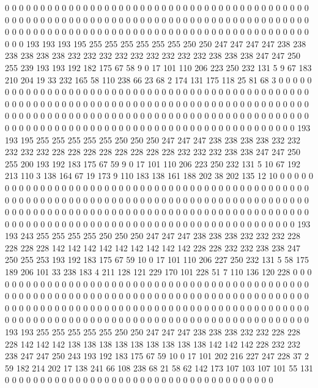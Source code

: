 0 0 0 0 0 0 0 0 0 0 0 0 0 0 0 0 0 0 0 0
0 0 0 0 0 0 0 0 0 0 0 0 0 0 0 0 0 0 0 0
0 0 0 0 0 0 0 0 0 0 0 0 0 0 0 0 0 0 0 0
0 0 0 0 0 0 0 0 0 0 0 0 0 0 0 0 0 0 0 0
0 0 0 0 0 0 0 0 0 0 0 0 0 0 0 0 0 0 0 0
0 0 0 0 0 0 0 0 0 0 0 0 0 0 0 0 0 0 0 0
0 0 0 0 0 0 0 0 0 0 0 0 193 193 193 195 255 255 255 255
255 255 250 250 247 247 247 247 238 238 238 238 238 238 232 232 232 232 232 232
232 232 232 238 238 238 247 247 250 255 239 193 193 192 182 175 67 58 9 0
17 101 110 206 223 250 232 131 5 9 67 183 210 204 19 33 232 165 58 110
238 66 23 68 2 174 131 175 118 25 81 68 3 0 0 0 0 0 0 0
0 0 0 0 0 0 0 0 0 0 0 0 0 0 0 0 0 0 0 0
0 0 0 0 0 0 0 0 0 0 0 0 0 0 0 0 0 0 0 0
0 0 0 0 0 0 0 0 0 0 0 0 0 0 0 0 0 0 0 0
0 0 0 0 0 0 0 0 0 0 0 0 0 0 0 0 0 0 0 0
0 0 0 0 0 0 0 0 0 0 0 0 0 0 0 0 0 0 0 0
0 0 0 0 0 0 0 0 0 0 0 0 0 0 0 0 0 0 0 0
0 0 0 0 0 0 0 0 0 0 0 0 0 0 0 0 0 0 0 0
0 0 0 0 0 0 0 0 0 0 0 0 0 0 0 0 0 0 0 0
0 0 0 0 0 0 0 0 193 193 195 255 255 255 255 255 250 250 250 247
247 247 238 238 238 238 232 232 232 232 232 228 228 228 228 228 228 228 228 232
232 232 238 238 247 247 250 255 200 193 192 183 175 67 59 9 0 17 101 110
206 223 250 232 131 5 10 67 192 213 110 3 138 164 67 19 173 9 110 183
138 161 188 202 38 202 135 12 10 0 0 0 0 0 0 0 0 0 0 0
0 0 0 0 0 0 0 0 0 0 0 0 0 0 0 0 0 0 0 0
0 0 0 0 0 0 0 0 0 0 0 0 0 0 0 0 0 0 0 0
0 0 0 0 0 0 0 0 0 0 0 0 0 0 0 0 0 0 0 0
0 0 0 0 0 0 0 0 0 0 0 0 0 0 0 0 0 0 0 0
0 0 0 0 0 0 0 0 0 0 0 0 0 0 0 0 0 0 0 0
0 0 0 0 0 0 0 0 0 0 0 0 0 0 0 0 0 0 0 0
0 0 0 0 0 0 0 0 0 0 0 0 0 0 0 0 0 0 0 0
0 0 0 0 0 0 0 0 0 0 0 0 0 0 0 0 0 0 0 0
0 0 0 0 193 193 243 255 255 255 255 250 250 250 247 247 247 238 238 238
232 232 232 228 228 228 228 142 142 142 142 142 142 142 142 142 228 228 232 232
238 238 247 250 255 253 193 192 183 175 67 59 10 0 17 101 110 206 227 250
232 131 5 58 175 189 206 101 33 238 183 4 211 128 121 229 170 101 228 51
7 110 136 120 228 0 0 0 0 0 0 0 0 0 0 0 0 0 0 0
0 0 0 0 0 0 0 0 0 0 0 0 0 0 0 0 0 0 0 0
0 0 0 0 0 0 0 0 0 0 0 0 0 0 0 0 0 0 0 0
0 0 0 0 0 0 0 0 0 0 0 0 0 0 0 0 0 0 0 0
0 0 0 0 0 0 0 0 0 0 0 0 0 0 0 0 0 0 0 0
0 0 0 0 0 0 0 0 0 0 0 0 0 0 0 0 0 0 0 0
0 0 0 0 0 0 0 0 0 0 0 0 0 0 0 0 0 0 0 0
0 0 0 0 0 0 0 0 0 0 0 0 0 0 0 0 0 0 0 0
0 0 0 0 0 0 0 0 0 0 0 0 0 0 0 0 0 0 0 0
193 193 255 255 255 255 255 250 250 247 247 247 238 238 238 232 232 228 228 228
142 142 142 138 138 138 138 138 138 138 138 138 142 142 142 228 232 232 238 247
247 250 243 193 192 183 175 67 59 10 0 17 101 202 216 227 247 228 37 2
59 182 214 202 17 138 241 66 108 238 68 21 58 62 142 173 107 103 107 101
55 131 0 0 0 0 0 0 0 0 0 0 0 0 0 0 0 0 0 0
0 0 0 0 0 0 0 0 0 0 0 0 0 0 0 0 0 0 0 0
